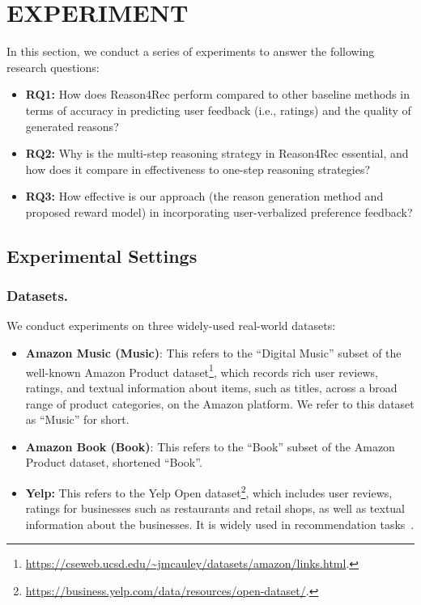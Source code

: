\section{EXPERIMENT}

In this section, we conduct a series of experiments to answer the following research questions:
\begin{itemize}[leftmargin=*]
    \item \textbf{RQ1:} 
    How does Reason4Rec perform compared to other baseline methods in terms of accuracy in predicting user feedback (i.e., ratings) and the quality of generated reasons?
    
    \item \textbf{RQ2:} Why is the multi-step reasoning strategy in Reason4Rec essential, and how does it compare in effectiveness to one-step reasoning strategies?
    
    \item \textbf{RQ3:} 
    How effective is our approach (the reason generation method and proposed reward model) in incorporating user-verbalized preference feedback?
\end{itemize}



\subsection{Experimental Settings}
\subsubsection{\textbf{Datasets.}}
We conduct experiments on three widely-used real-world datasets:
\begin{itemize}[leftmargin=*]
\item \textbf{Amazon Music (Music)}: This refers to the ``Digital Music'' subset of the well-known Amazon Product dataset\footnote{\url{https://cseweb.ucsd.edu/~jmcauley/datasets/amazon/links.html}.}, which records rich user reviews, ratings, and textual information about items, such as titles, across a broad range of product categories, on the Amazon platform. We refer to this dataset as ``Music'' for short.

\item \textbf{Amazon Book (Book)}: This refers to the ``Book'' subset of the Amazon Product dataset, shortened ``Book''.

\item \textbf{Yelp:}
This refers to the Yelp Open dataset\footnote{\url{https://business.yelp.com/data/resources/open-dataset/}.}, which includes user reviews, ratings for businesses such as restaurants and retail shops, as well as textual information about the businesses. It is widely used in recommendation tasks~\cite{rating_predict1}.
\end{itemize}



